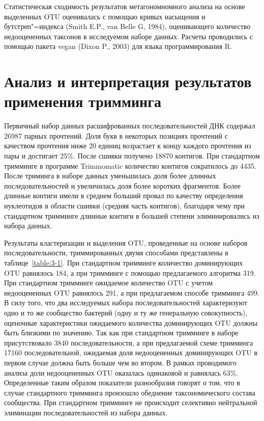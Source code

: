 \documentclass[a4paper,12pt,openany,final]{extreport}
\begin{document}
Статистическая сходимость результатов метагономномного анализа на основе выделенных OTU оценивалась с помощью кривых насыщения и бутстреп"=индекса (Smith E.P., van Belle G, 1984), оценивающего количество недооцененных таксонов в исследуемом наборе данных. Расчеты проводились с помощью пакета vegan (Dixon P., 2003) для языка программирования R.

\section{Анализ и интерпретация результатов применения тримминга}

Первичный набор данных расшифрованных последовательностей ДНК содержал 26987 парных прочтений.  Доля букв в некоторых позициях прочтений с качеством прочтения ниже 20 единиц возрастает к концу каждого прочтения из пары и достигает 25\%.  После сшивки получено 18870 контигов. При стандартном тримминге в программе Trimmomatic количество контигов сократилось до 4435. После триминга в наборе данных уменьшилась доля более длинных последовательностей и увеличилась доля более коротких фрагментов. Более длинные контиги имели в среднем больший провал по качеству определения нуклеотидов в области сшивки (средняя часть контигов), благодаря чему при стандартном тримминге длинные контиги в большей степени элиминировались из набора данных.

Результаты кластеризации и выделения OTU, проведенные на основе наборов последовательности, триммированных двумя способами представлены в таблице~\ref{table:3-1}. При стандартном тримминге количество доминирующих OTU равнялось 184, а при тримминге с помощью предлагаемого алгоритма 319. При стандартном тримминге ожидаемое количество OTU с учетом недооцененных OTU равнялось 291, а при предлагаемом способе тримминга 499. В силу того, что два исследуемых набора последовательностей характеризуют одно и то же сообщество бактерий (одну и ту же генеральную совокупность), оценочные характеристики ожидаемого количества доминирующих OTU должны быть близкими по значению. Так как при стандартном тримминге в наборе присутствовало 3840 последовательности, а при предлагаемой схеме тримминга 17160 последовательной, ожидаемая доля недооцененных доминирующих OTU в первом случае должна быть больше чем во втором. В рамках проводимого анализа доли недооцененных OTU оказалась одинаковой и равнялась 63\%. Определенные таким образом показатели разнообразия говорят о том, что в случае стандартного тримминга произошло обеднение таксономического состава сообщества. При стандартном тримминге не происходит селективно нейтральной элиминации последовательностей из набора данных.
\end{document}
